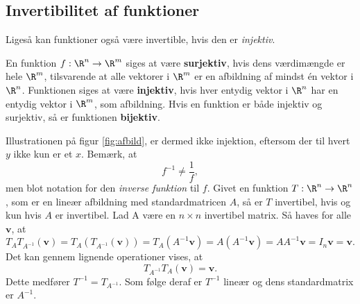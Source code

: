 %
%
\subsection{Invertibilitet af funktioner}
%
% 
Ligeså kan funktioner også være invertible, hvis den er \textit{injektiv}.
%
\begin{defn}{}{}
En funktion $f:\R^n \rightarrow \R^m$ siges at være \textbf{surjektiv}, hvis dens værdimængde er hele $\R^m$, tilsvarende at alle vektorer i $\R^m$ er en afbildning af mindst én vektor i $\R^n$.
Funktionen siges at være \textbf{injektiv}, hvis hver entydig vektor i $\R^n$ har en entydig vektor i $\R^m$, som afbildning.
Hvis en funktion er både injektiv og surjektiv, så er funktionen \textbf{bijektiv}.
\end{defn}
\noindent
%
Illustrationen på figur \ref{fig:afbild}, er dermed ikke injektion, eftersom der til hvert $y$ ikke kun er et $x$. 
%
%
Bemærk, at
$$f^{-1} \neq \frac{1}{f},$$
men blot notation for den \textit{inverse funktion} til $f$.
Givet en funktion $T:\R^n \rightarrow \R^n$, som er en lineær afbildning med standardmatricen $A$, så er $T$ invertibel, hvis og kun hvis $A$ er invertibel. 
Lad A være en $n \times n$ invertibel matrix. 
Så haves for alle $\textbf{v}$, at
$$T_AT_{A^{-1}}(\textbf{v})=T_A(T_{A^{-1}}(\textbf{v}))=T_A(A^{-1}\textbf{v})=A(A^{-1}\textbf{v})=AA^{-1}\textbf{v}=I_n\textbf{v}=\textbf{v}.$$
Det kan gennem lignende operationer vises, at
$$T_{A^{-1}}T_A(\textbf{v})=\textbf{v}.$$
%
Dette medfører $T^{-1}=T_{A^{-1}}$. 
Som følge deraf er $T^{-1}$ lineær og dens standardmatrix er $A^{-1}$.
\\
%
